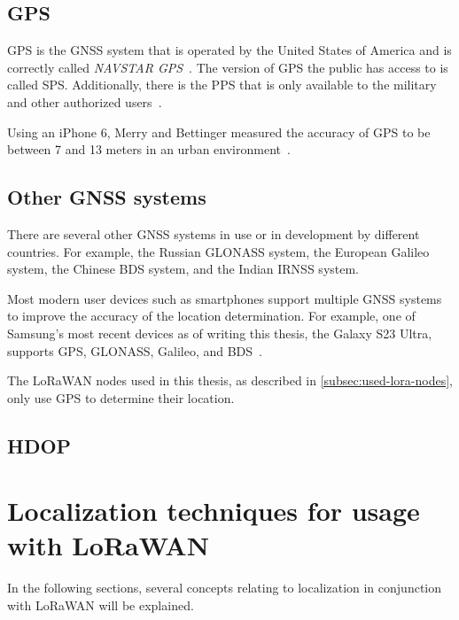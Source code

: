 \subsection{\acf{GPS}}

\ac{GPS} is the \ac{GNSS} system that is operated by the United States of America and is correctly called \emph{NAVSTAR \ac{GPS}}~\cite{department_of_defense_usa_gps_2020}.
The version of GPS the public has access to is called \acf{SPS}.
Additionally, there is the \acf{PPS} that is only available to the military and other authorized users~\cite{department_of_defense_usa_gps_2007}.

Using an iPhone 6, Merry and Bettinger measured the accuracy of \ac{GPS} to be between 7 and 13 meters in an urban environment~\cite{merry_smartphone_2019}.

\subsection{Other \acs{GNSS} systems}

There are several other \ac{GNSS} systems in use or in development by different countries.
For example, the Russian \acf{GLONASS} system, the European \acf{Galileo} system, the Chinese \acf{BDS} system, and the Indian \acf{IRNSS} system.

Most modern user devices such as smartphones support multiple \ac{GNSS} systems to improve the accuracy of the location determination.
For example, one of Samsung's most recent devices as of writing this thesis, the Galaxy S23 Ultra, supports \ac{GPS}, \ac{GLONASS}, \ac{Galileo}, and \ac{BDS}~\cite{gsmarena_samsung_2023}.

The \ac{LoRaWAN} nodes used in this thesis, as described in \cref{subsec:used-lora-nodes}, only use \ac{GPS} to determine their location.

\subsection{\acf{HDOP}}


\section{Localization techniques for usage with \acs{LoRaWAN}}\label{sec:lorawan-localization-techniques}

In the following sections, several concepts relating to localization in conjunction with \ac{LoRaWAN} will be explained.

